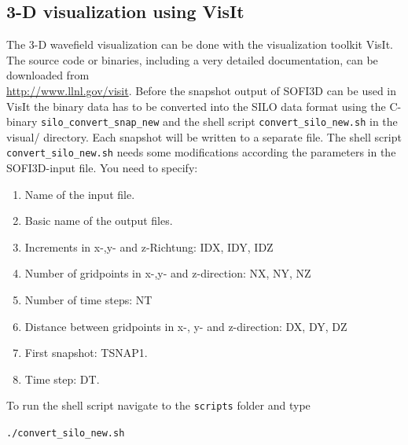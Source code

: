 \documentclass[11pt,onecolumn,oneside]{article}
\begin{document}
\clearpage



\subsection{3-D visualization using VisIt}
The 3-D wavefield visualization can be done with the visualization toolkit VisIt. The source code or binaries, including a very detailed documentation, can be downloaded from \\ \url{http://www.llnl.gov/visit}. Before the snapshot output of SOFI3D can be used in VisIt the binary data has to be converted into the SILO data format using the C-binary  \lstinline{silo_convert_snap_new} and the shell script  \lstinline{convert_silo_new.sh} in the visual/ directory. Each snapshot will be written to a separate file. The shell script  \lstinline{convert_silo_new.sh} needs
some modifications according the parameters in the SOFI3D-input file. You need to specify:

\begin{enumerate}
\item Name of the input file.
\item Basic name of the output files.
\item Increments in x-,y- and z-Richtung: IDX, IDY, IDZ
\item Number of gridpoints in x-,y- and z-direction: NX, NY, NZ
\item Number of time steps: NT
\item Distance between gridpoints in x-, y- and z-direction: DX, DY, DZ
\item First snapshot: TSNAP1.
\item Time step: DT. 
\end{enumerate}  

To run the shell script navigate to the  \lstinline{scripts} folder and type 

 \lstinline{./convert_silo_new.sh}
\end{document}
